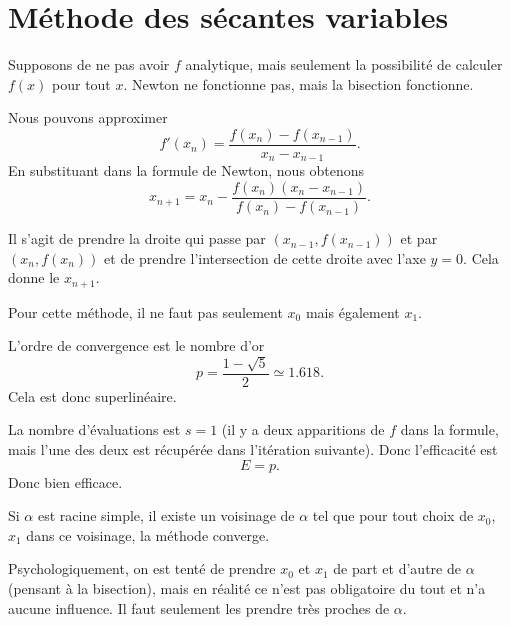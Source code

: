 \section{Méthode des sécantes variables}
\label{SECooIUEUooVcHAoc}

Supposons de ne pas avoir \( f\) analytique, mais seulement la possibilité de calculer \( f(x)\) pour tout \( x\). Newton ne fonctionne pas, mais la bisection fonctionne.

Nous pouvons approximer
\begin{equation}
    f'(x_n)=\frac{ f(x_n)-f(x_{n-1}) }{ x_n-x_{n-1} }.
\end{equation}
En substituant dans la formule de Newton, nous obtenons
\begin{equation}
    x_{n+1}=x_n-\frac{ f(x_n)(x_n-x_{n-1}) }{ f(x_n)-f(x_{n-1}) }.
\end{equation}

Il s'agit de prendre la droite qui passe par \( (x_{n-1},f(x_{n-1}))\) et par \( (x_n,f(x_n))\) et de prendre l'intersection de cette droite avec l'axe \( y=0\). Cela donne le \( x_{n+1}\).

Pour cette méthode, il ne faut pas seulement \( x_0\) mais également \( x_1\).

L'ordre de convergence est le nombre d'or
\begin{equation}    \label{EQooQEFCooUsGVjP}
    p=\frac{ 1-\sqrt{ 5 } }{ 2 }\simeq 1.618.
\end{equation}
Cela est donc superlinéaire.

La nombre d'évaluations est \( s=1\) (il y a deux apparitions de \( f\) dans la formule, mais l'une des deux est récupérée dans l'itération suivante). Donc l'efficacité est
\begin{equation}
    E=p.
\end{equation}
Donc bien efficace.

\begin{proposition}
    Si \( \alpha\) est racine simple, il existe un voisinage de \( \alpha\) tel que pour tout choix de \( x_0\), \( x_1\) dans ce voisinage, la méthode converge.
\end{proposition}

Psychologiquement, on est tenté de prendre \( x_0\) et \( x_1\) de part et d'autre de \( \alpha\) (pensant à la bisection), mais en réalité ce n'est pas obligatoire du tout et n'a aucune influence. Il faut seulement les prendre très proches de \( \alpha\).

